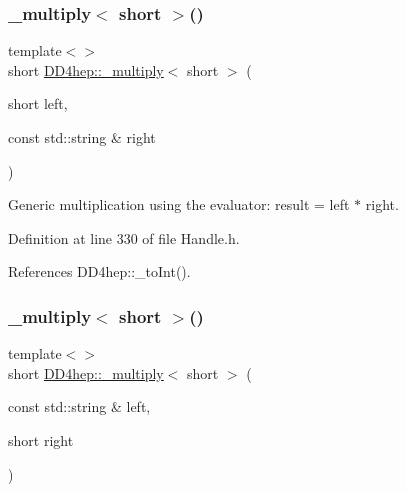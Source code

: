 \subsubsection{\texorpdfstring{\+\_\+multiply$<$ short $>$()}{\_multiply< short >()}\hspace{0.1cm}{\footnotesize\ttfamily [2/3]}}
{\footnotesize\ttfamily template$<$$>$ \\
short \hyperlink{group___d_d4_h_e_p___g_e_o_m_e_t_r_y_gab860c2299e2eb50e537c5079fb0c9c51}{D\+D4hep\+::\+\_\+multiply}$<$ short $>$ (\begin{DoxyParamCaption}\item[{short}]{left,  }\item[{const std\+::string \&}]{right }\end{DoxyParamCaption})\hspace{0.3cm}{\ttfamily [inline]}}



Generic multiplication using the evaluator\+: result = left $\ast$ right. 



Definition at line 330 of file Handle.\+h.



References D\+D4hep\+::\+\_\+to\+Int().

\hypertarget{group___d_d4_h_e_p___g_e_o_m_e_t_r_y_ga6153a90fb590d07eb9a3faf5cb6dbfe7}{}\label{group___d_d4_h_e_p___g_e_o_m_e_t_r_y_ga6153a90fb590d07eb9a3faf5cb6dbfe7} 
\subsubsection{\texorpdfstring{\+\_\+multiply$<$ short $>$()}{\_multiply< short >()}\hspace{0.1cm}{\footnotesize\ttfamily [3/3]}}
{\footnotesize\ttfamily template$<$$>$ \\
short \hyperlink{group___d_d4_h_e_p___g_e_o_m_e_t_r_y_gab860c2299e2eb50e537c5079fb0c9c51}{D\+D4hep\+::\+\_\+multiply}$<$ short $>$ (\begin{DoxyParamCaption}\item[{const std\+::string \&}]{left,  }\item[{short}]{right }\end{DoxyParamCaption})\hspace{0.3cm}{\ttfamily [inline]}}



